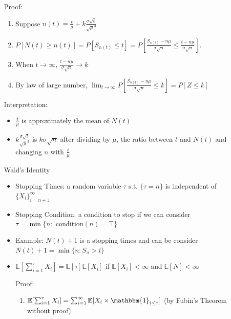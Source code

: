 \documentclass[a4paper]{article}
\begin{document}
\begin{itemize}
\begin{itemize}
\begin{itemize}
                        Proof:
                        \begin{enumerate}
                            \item Suppose $n(t) = \frac{t}{\mu} + k \frac{\sigma \sqrt{t}}{\sqrt{\mu}^3}$
                            \item $P[N(t) \geq n(t)] = P[S_{n(t)} \leq t] = P[\frac{S_{n(t)} - n\mu}{\sigma \sqrt{n}} \leq \frac{t - n\mu}{\sigma \sqrt{n}}]$.
                            \item When $t \rightarrow \infty$, $\frac{t - n\mu}{\sigma \sqrt{n}} \rightarrow k$
                            \item By law of large number, $\lim_{t \rightarrow \infty} P[\frac{S_{n(t)} - n\mu}{\sigma \sqrt{n}} \leq k] = P[Z \leq k]$
                        \end{enumerate}
                        Interpretation:
                        \begin{itemize}
                            \item $\frac{t}{\mu}$ is approximately the mean of $N(t)$
                            \item $k \frac{\sigma \sqrt{t}}{\sqrt{\mu}^3}$ is $k\sigma \sqrt{n}$ after dividing by $\mu$, the ratio between $t$ and $N(t)$ and changing $n$ with $\frac{t}{\mu}$
                        \end{itemize}
                \end{itemize}
                Wald's Identity
                \begin{itemize}
                    \item Stopping Times: a random variable $\tau$ s.t. $\{\tau = n\}$ is independent of $\{X_i\}_{i=n+1}^\infty$
                    \item Stopping Condition: a condition to stop if we can consider $\tau = \min\{n: \text{ condition}(n) = \top \}$
                    \item Example: $N(t) + 1$ is a stopping times and can be consider $N(t) + 1 = \min\{n: S_n > t\}$
                    \item $\mathbb{E}[\sum_{i=1}^\tau X_i] = \mathbb{E}[\tau] \mathbb{E}[X_i]$ if $\mathbb{E}[X_i] < \infty$ and $\mathbb{E}[N] < \infty$

                        Proof:
                        \begin{enumerate}
                            \item $\mathbb{E}[\sum_{i=1}^\tau X_i] = \sum_{i=1}^\infty \mathbb{E}[X_i \times \mathbbm{1}_{i\leq \tau}]$ (by Fubin's Theorem without proof)


\end{enumerate}
\end{itemize}
\end{itemize}
\end{itemize}
\end{document}
